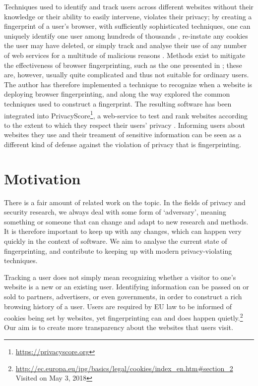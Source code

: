 \documentclass[
    fontsize=12pt,
    headings=small,
    parskip=half,
    bibliography=totoc,
    numbers=noenddot,
    open=any
    ]{scrreprt}
\begin{document}
Techniques used to identify and track users across different websites without
their knowledge or their ability to easily intervene, violates their privacy; by creating a fingerprint
of a user's browser, with sufficiently sophisticated techniques, one can uniquely identify one user
among hundreds of thousands \cite{am_i_unique}, re-instate any cookies the user may have deleted,
or simply track and analyse their use of any number of web services for a multitude of malicious reasons \cite{eckersley2010unique}.
Methods exist to mitigate the effectiveness of browser fingerprinting, such as the one presented
in \cite{laperdrix2015mitigating};
these are, however, usually quite complicated and thus not suitable for ordinary users.
The author has therefore implemented a technique to recognize when a website is deploying browser fingerprinting,
and along the way explored the common techniques used to construct a fingerprint. The resulting software has been integrated into
PrivacyScore\footnote{\url{https://privacyscore.org}}, a web-service to test and rank websites according to the extent to which they
respect their users' privacy \cite{privacyscore}.
Informing users about websites they use and their treament of sensitive information
can be seen as a different kind of defense against the violation of privacy that is fingerprinting.

\section{Motivation}
There is a fair amount of related work on the topic. In the fields of privacy and security research,
we always deal with some form of `adversary', meaning something or someone that can change and adapt to new
research and methods. It is therefore important to keep up with any changes, which can happen very quickly
in the context of software.
We aim to analyse the current state of fingerprinting, and contribute to keeping up with modern privacy-violating
techniques.

Tracking a user does not simply mean recognizing whether a visitor to one's website is a new or an existing user.
Identifying information can be passed on or sold to partners, advertisers, or even governments, in order to
construct a rich browsing history of a user. Users are required by EU law to be informed of cookies being set
by websites, yet fingerprinting can and does happen quietly.\footnote{\url{http://ec.europa.eu/ipg/basics/legal/cookies/index\_en.htm\#section\_2} Visited on May 3, 2018}
Our aim is to create more transparency about the websites that users visit.
\end{document}
